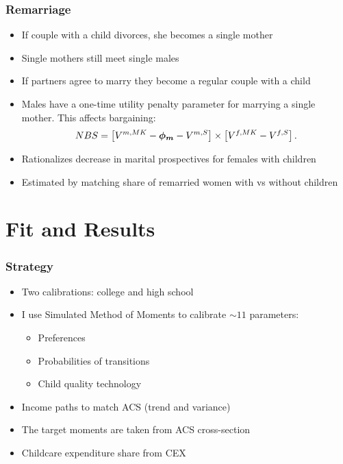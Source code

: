 \documentclass{beamer}
\begin{document}
\begin{frame}
\frametitle{Remarriage}
\begin{itemize}
\item If couple with a child divorces, she becomes a single mother
\item Single mothers still meet single males
\item If partners agree to marry they become a regular couple with a child
\item Males have a one-time utility penalty parameter for marrying a single mother. This affects bargaining:
\[NBS = \left[ V^{m,MK} - {\text{\boldmath$\phi_m$}} - V^{m,S}\right] \times  \left[ V^{f,MK} - V^{f,S}\right].\]
\item Rationalizes decrease in marital prospectives for females with children
\item Estimated by matching share of remarried women with vs without children
\end{itemize}
\end{frame}



\section{Fit and Results}
\begin{frame}
\frametitle{Strategy}
\begin{itemize}

\item Two calibrations: college and high school
\item I use Simulated Method of Moments to calibrate $\sim 11$ parameters:
\begin{itemize}
\item Preferences
\item Probabilities of transitions
\item Child quality technology
\end{itemize}
\item Income paths to match ACS (trend and variance)
\item The target moments are taken from ACS cross-section
\item Childcare expenditure share from CEX
\end{itemize}
\end{frame}
\end{document}
